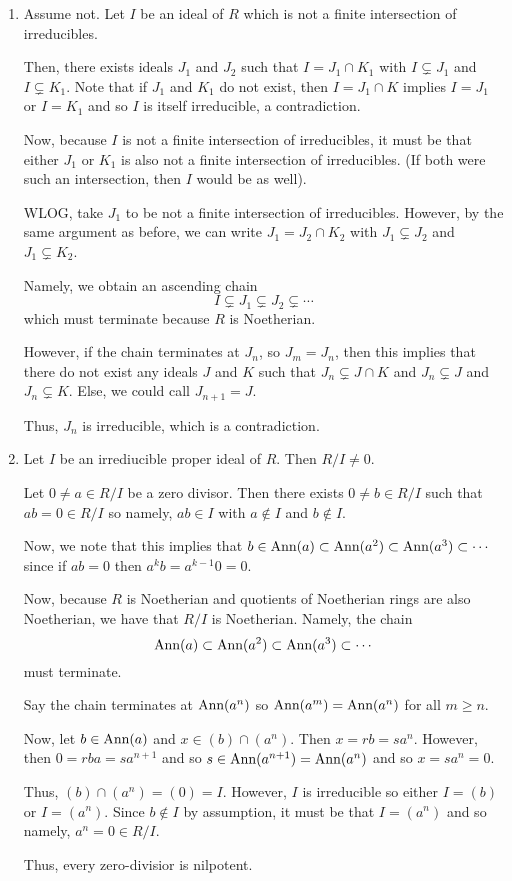 \documentclass[12pt]{Qual}
\begin{document}
\begin{solution}$\,$
\begin{enumerate}[label=(\alph*)]
    \item Assume not. Let $I$ be an ideal of $R$ which is not a finite intersection of irreducibles.

    Then, there exists ideals $J_1$ and $J_2$ such that $I=J_1\cap K_1$ with $I\subsetneq J_1$ and $I\subsetneq K_1$. Note that if $J_1$ and $K_1$ do not exist, then $I=J_1\cap K$ implies $I=J_1$ or $I=K_1$ and so $I$ is itself irreducible, a contradiction.

    Now, because $I$ is not a finite intersection of irreducibles, it must be that either $J_1$ or $K_1$ is also not a finite intersection of irreducibles. (If both were such an intersection, then $I$ would be as well).

    WLOG, take $J_1$ to be not a finite intersection of irreducibles. However, by the same argument as before, we can write $J_1=J_2\cap K_2$ with $J_1\subsetneq J_2$ and $J_1\subsetneq K_2$.

    Namely, we obtain an ascending chain $$I\subsetneq J_1\subsetneq J_2\subsetneq\cdots$$ which must terminate because $R$ is Noetherian.

    However, if the chain terminates at $J_n$, so $J_m=J_n$, then this implies that there do not exist any ideals $J$ and $K$ such that $J_n\subsetneq J\cap K$ and $J_n\subsetneq J$ and $J_n\subsetneq K$. Else, we could call $J_{n+1}=J$.

    Thus, $J_n$ is irreducible, which is a contradiction.
    \item Let $I$ be an irrediucible proper ideal of $R$. Then $R/I\not=0$.

    Let $0\not=a\in R/I$ be a zero divisor. Then there exists $0\not=b\in R/I$ such that $ab=0\in R/I$ so namely, $ab\in I$ with $a\notin I$ and $b\notin I$.

    Now, we note that this implies that $b\in\text{Ann}(a)\subset\text{Ann}(a^2)\subset\text{Ann}(a^3)\subset\cdots$ since if $ab=0$ then $a^kb=a^{k-1}0=0$.

    Now, because $R$ is Noetherian and quotients of Noetherian rings are also Noetherian, we have that $R/I$ is Noetherian. Namely, the chain $$\text{Ann}(a)\subset\text{Ann}(a^2)\subset\text{Ann}(a^3)\subset\cdots$$ must terminate.

    Say the chain terminates at $\text{Ann}(a^n)$ so $\text{Ann}(a^m)=\text{Ann}(a^n)$ for all $m\ge n$.

    Now, let $b\in\text{Ann}(a)$ and $x\in(b)\cap(a^n)$. Then $x=rb=sa^n$. However, then $0=rba=sa^{n+1}$ and so $s\in\text{Ann}(a^{n+1})=\text{Ann}(a^n)$ and so $x=sa^n=0$.

    Thus, $(b)\cap (a^n)=(0)=I$. However, $I$ is irreducible so either $I=(b)$ or $I=(a^n)$. Since $b\notin I$ by assumption, it must be that $I=(a^n)$ and so namely, $a^n=0\in R/I$.

    Thus, every zero-divisior is nilpotent.
\end{enumerate}
\end{solution}
\newpage
\end{document}
